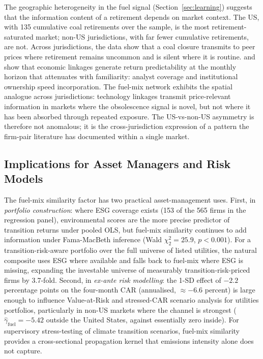 \documentclass[12pt,a4paper]{article}
\begin{document}
The geographic heterogeneity in the fuel signal (Section~\ref{sec:learning}) suggests that the information content of a retirement depends on market context. The US, with 135 cumulative coal retirements over the sample, is the most retirement-saturated market; non-US jurisdictions, with far fewer cumulative retirements, are not. Across jurisdictions, the data show that a coal closure transmits to peer prices where retirement remains uncommon and is silent where it is routine. \citet{CohenFrazzini2008} and \citet{MenzlyOzbas2010} show that economic linkages generate return predictability at the monthly horizon that attenuates with familiarity: analyst coverage and institutional ownership speed incorporation. The fuel-mix network exhibits the spatial analogue across jurisdictions: technology linkages transmit price-relevant information in markets where the obsolescence signal is novel, but not where it has been absorbed through repeated exposure. The US-vs-non-US asymmetry is therefore not anomalous; it is the cross-jurisdiction expression of a pattern the firm-pair literature has documented within a single market.

\subsection{Implications for Asset Managers and Risk Models}\label{sec:asset_managers}

The fuel-mix similarity factor has two practical asset-management uses. First, in \emph{portfolio construction}: where ESG coverage exists (153 of the 565 firms in the regression panel), environmental scores are the more precise predictor of transition returns under pooled OLS, but fuel-mix similarity continues to add information under Fama-MacBeth inference (Wald $\chi^2_2 = 25.9$, $p < 0.001$). For a transition-risk-aware portfolio over the full universe of listed utilities, the natural composite uses ESG where available and falls back to fuel-mix where ESG is missing, expanding the investable universe of measurably transition-risk-priced firms by 3.7-fold. Second, in \emph{ex-ante risk modelling}: the 1-SD effect of $-2.2$ percentage points on the four-month CAR (annualised, $\approx -6.6$ percent) is large enough to influence Value-at-Risk and stressed-CAR scenario analysis for utilities portfolios, particularly in non-US markets where the channel is strongest ($\hat\gamma_{\mathrm{fuel}} = -5.42$ outside the United States, against essentially zero inside). For supervisory stress-testing of climate transition scenarios, fuel-mix similarity provides a cross-sectional propagation kernel that emissions intensity alone does not capture.
\end{document}
